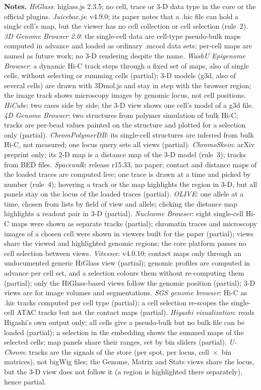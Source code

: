 \medskip\noindent\textbf{Notes.}
\emph{HiGlass}: higlass.js 2.3.5; no cell, trace or 3-D data type in the core or the official plugins.
\emph{Juicebox.js}: v4.9.0; its paper notes that a .hic file can hold a single cell's map, but the viewer has no cell collection or cell selection (rule~2).
\emph{3D Genome Browser 2.0}: the single-cell data are cell-type pseudo-bulk maps computed in advance and loaded as ordinary .mcool data sets; per-cell maps are named as future work; no 3-D rendering despite the name.
\emph{WashU Epigenome Browser}: a dynamic Hi-C track steps through a fixed set of maps, also of single cells, without selecting or summing cells (partial); 3-D models (g3d, also of several cells) are drawn with 3Dmol.js and stay in step with the browser region; the image track shows microscopy images by genomic locus, not cell positions.
\emph{HiCube}: two cases side by side; the 3-D view shows one cell's model of a g3d file.
\emph{4D Genome Browser}: two structures from polymer simulation of bulk Hi-C; tracks are per-bead values painted on the structure and plotted for a selection only (partial).
\emph{ChromPolymerDB}: its single-cell structures are inferred from bulk Hi-C, not measured; one locus query sets all views (partial).
\emph{ChromoSkein}: arXiv preprint only; its 2-D map is a distance map of the 3-D model (rule~3); tracks from BED files.
\emph{Spacewalk}: release r15.33, no paper; contact and distance maps of the loaded traces are computed live; one trace is drawn at a time and picked by number (rule~4); hovering a track or the map highlights the region in 3-D, but all panels stay on the locus of the loaded traces (partial).
\emph{OLIVE}: one allele at a time, chosen from lists by field of view and allele; clicking the distance map highlights a readout pair in 3-D (partial).
\emph{Nucleome Browser}: eight single-cell Hi-C maps were shown as separate tracks (partial); chromatin traces and microscopy images of a chosen cell were shown in viewers built for the paper (partial); views share the viewed and highlighted genomic regions; the core platform passes no cell selection between views.
\emph{Vitessce}: v4.0.10; contact maps only through an undocumented generic HiGlass view (partial); genomic profiles are computed in advance per cell set, and a selection colours them without re-computing them (partial); only the HiGlass-based views follow the genomic position (partial); 3-D views are for image volumes and segmentations.
\emph{SGS genome browser}: Hi-C as .hic tracks computed per cell type (partial); a cell selection re-scopes the single-cell ATAC tracks but not the contact maps (partial).
\emph{Higashi visualization}: reads Higashi's own output only; all cells give a pseudo-bulk but no bulk file can be loaded (partial); a selection in the embedding shows the summed maps of the selected cells; map panels share their ranges, set by bin sliders (partial).
\emph{U-Chrom}: tracks are the signals of the store (per spot, per locus, cell~$\times$~bin matrices), not bigWig files; the Genome, Matrix and Stats views share the locus, but the 3-D view does not follow it (a region is highlighted there separately), hence partial.

